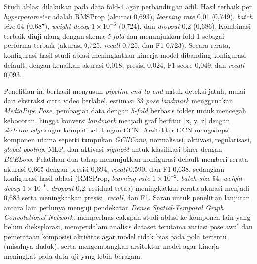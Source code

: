 \begin{center}
Studi ablasi dilakukan pada data fold-4 agar perbandingan adil. Hasil terbaik per \textit{hyperparameter} adalah RMSProp (akurasi 0,693), \textit{learning rate} 0,01 (0,749), \textit{batch size} 64 (0,687), \textit{weight decay} $1\times10^{-6}$ (0,724), dan \textit{dropout} 0,2 (0,686). Kombinasi terbaik diuji ulang dengan skema \textit{5-fold} dan menunjukkan fold-1 sebagai performa terbaik (akurasi 0,725, \textit{recall} 0,725, dan F1 0,723). Secara rerata, konfigurasi hasil studi ablasi meningkatkan kinerja model dibanding konfigurasi default, dengan kenaikan akurasi 0,018, presisi 0,024, F1-score 0,049, dan \textit{recall} 0,093. \par

Penelitian ini berhasil menyusun \textit{pipeline end-to-end} untuk deteksi jatuh, mulai dari ekstraksi citra video berlabel, estimasi 33 \textit{pose landmark} menggunakan \textit{MediaPipe Pose}, pembagian data dengan \textit{5-fold} berbasis folder untuk mencegah kebocoran, hingga konversi \textit{landmark} menjadi graf berfitur [x, y, z] dengan \textit{skeleton edges} agar kompatibel dengan GCN. Arsitektur GCN mengadopsi komponen utama seperti tumpukan \textit{GCNConv}, normalisasi, aktivasi, regularisasi, \textit{global pooling}, MLP, dan aktivasi \textit{sigmoid} untuk klasifikasi biner dengan \textit{BCELoss}. Pelatihan dua tahap menunjukkan konfigurasi default memberi rerata akurasi 0,665 dengan presisi 0,694, \textit{recall} 0,590, dan F1 0,638, sedangkan konfigurasi hasil ablasi (RMSProp, \textit{learning rate} $1\times10^{-2}$, \textit{batch size} 64, \textit{weight decay} $1\times10^{-6}$, \textit{dropout} 0,2, residual tetap) meningkatkan rerata akurasi menjadi 0,683 serta meningkatkan presisi, \textit{recall}, dan F1. Saran untuk penelitian lanjutan antara lain perlunya menguji pendekatan \textit{Dense Spatial-Temporal Graph Convolutional Network}, memperluas cakupan studi ablasi ke komponen lain yang belum dieksplorasi, memperdalam analisis dataset terutama variasi pose awal dan pemerataan komposisi aktivitas agar model tidak bias pada pola tertentu (misalnya duduk), serta mengembangkan arsitektur model agar kinerja meningkat pada data uji yang lebih beragam. \par

	\vfill
	
\end{center}
\clearpage